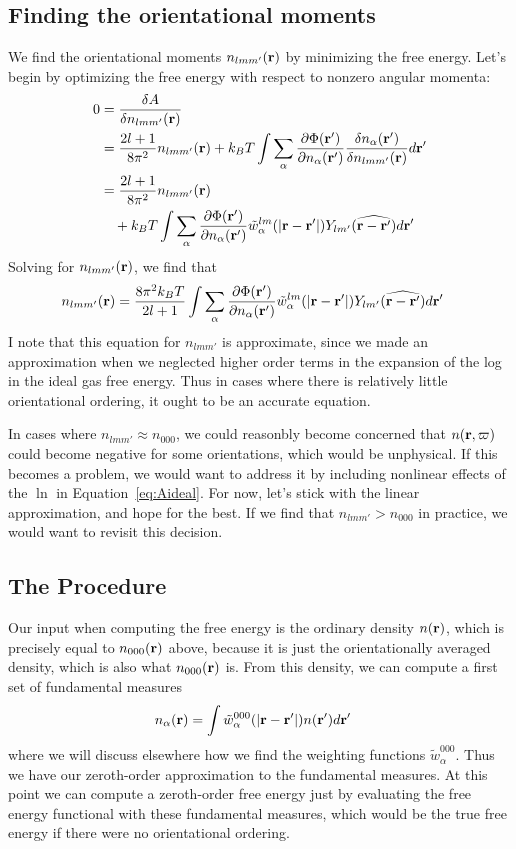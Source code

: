 \documentclass[letterpaper,twocolumn,amsmath,amssymb,pre]{revtex4-1}
\begin{document}
\subsection{Finding the orientational moments}
We find the orientational moments $n_{lmm'}(\mathbf{r})$ by minimizing the
free energy.  Let's begin by optimizing the free energy with respect
to nonzero angular momenta:
\begin{align}
  0&=\frac{\delta A}{\delta n_{lmm'}(\mathbf{r})} \\
  &= \frac{2l+1}{8\pi^2}n_{lmm'}(\mathbf{r})
  + k_BT \int\sum_\alpha
  \frac{\partial \Phi(\mathbf{r}')}{\partial n_\alpha(\mathbf{r}')}
  \frac{\delta n_\alpha(\mathbf{r}')}{\delta n_{lmm'}(\mathbf{r})} d\mathbf{r}'
  \\
  &=
   \frac{2l+1}{8\pi^2}n_{lmm'}(\mathbf{r})
  \\&\quad+ k_BT \int\sum_\alpha
  \frac{\partial \Phi(\mathbf{r}')}{\partial n_\alpha(\mathbf{r}')}
  \tilde{w}_\alpha^{lm}(|\mathbf{r}-\mathbf{r}'|)Y_{lm'}(\widehat{\mathbf{r}-\mathbf{r}'}) d\mathbf{r}'
\end{align}
Solving for $n_{lmm'}(\mathbf{r})$, we find that
\begin{align}\label{eq:nlmm'}
  n_{lmm'}(\mathbf{r}) &= \frac{8\pi^2k_BT}{2l+1}
  \int\sum_\alpha
  \frac{\partial \Phi(\mathbf{r}')}{\partial n_\alpha(\mathbf{r}')}
  \tilde{w}_\alpha^{lm}(|\mathbf{r}-\mathbf{r}'|)Y_{lm'}(\widehat{\mathbf{r}-\mathbf{r}'}) d\mathbf{r}'
\end{align}
I note that this equation for $n_{lmm'}$ is approximate, since we made
an approximation when we neglected higher order terms in the expansion
of the log in the ideal gas free energy.  Thus in cases where there is
relatively little orientational ordering, it ought to be an accurate
equation.

In cases where $n_{lmm'} \approx n_{000}$, we could reasonbly become
concerned that $n(\mathbf{r}, \mathbf{\varpi})$ could become negative for some
orientations, which would be unphysical.  If this becomes a problem,
we would want to address it by including nonlinear effects of the
$\ln$ in Equation~\ref{eq:Aideal}.  For now, let's stick with the
linear approximation, and hope for the best.  If we find that
$n_{lmm'} > n_{000}$ in practice, we would want to revisit this decision.

\subsection{The Procedure}
Our input when computing the free energy is the ordinary density
$n(\mathbf{r})$, which is precisely equal to $n_{000}(\mathbf{r})$ above, because it
is just the orientationally averaged density, which is also what
$n_{000}(\mathbf{r})$ is.  From this density, we can compute a first set of
fundamental measures
\begin{align}
  n_\alpha(\mathbf{r}) &= \int \tilde{w}_\alpha^{000}(|\mathbf{r}-\mathbf{r}'|)n(\mathbf{r}')d\mathbf{r}'
\end{align}
where we will discuss elsewhere how we find the weighting functions
$\tilde{w}_\alpha^{000}$.  Thus we have our zeroth-order approximation
to the fundamental measures.  At this point we can compute a
zeroth-order free energy just by evaluating the free energy functional
with these fundamental measures, which would be the true free energy
if there were no orientational ordering.
\end{document}

